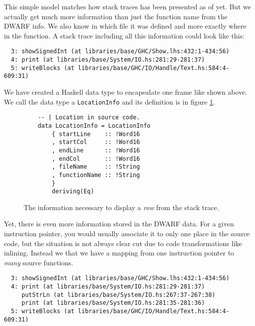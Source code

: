 This simple model matches how stack traces has been presented as of
yet. But we actually get much more information than just the function name
from the DWARF info. We also know in which file it was defined and more
exactly where in the function. A stack trace including all this
information could look like this:

\begin{verbatim}
  3: showSignedInt (at libraries/base/GHC/Show.lhs:432:1-434:56)
  4: print (at libraries/base/System/IO.hs:281:29-281:37)
  5: writeBlocks (at libraries/base/GHC/IO/Handle/Text.hs:584:4-609:31)
\end{verbatim}

We have created a Haskell data type to encapsulate one frame like shown
above. We call the data type a \texttt{LocationInfo} and its definition
is in figure \ref{fig:location_info}.

\begin{figure}
\begin{mdframed}
  \begin{verbatim}
    -- | Location in source code.
    data LocationInfo = LocationInfo
        { startLine    :: !Word16
        , startCol     :: !Word16
        , endLine      :: !Word16
        , endCol       :: !Word16
        , fileName     :: !String
        , functionName :: !String
        }
        deriving(Eq)
  \end{verbatim}
  \caption{The information necessary to display a \emph{row} from the stack
    trace.}
  \label{fig:location_info}
\end{mdframed}
\end{figure}

Yet, there is even more information stored in the DWARF data. For a
given instruction pointer, you would usually associate it to only one
place in the source code, but the situation is not always clear cut due
to code transformations like inlining. Instead we that we have a
mapping from one instruction pointer to \emph{many} source functions.

\begin{verbatim}
  3: showSignedInt (at libraries/base/GHC/Show.lhs:432:1-434:56)
  4: print (at libraries/base/System/IO.hs:281:29-281:37)
     putStrLn (at libraries/base/System/IO.hs:267:37-267:38)
     print (at libraries/base/System/IO.hs:281:35-281:36)
  5: writeBlocks (at libraries/base/GHC/IO/Handle/Text.hs:584:4-609:31)
\end{verbatim}

